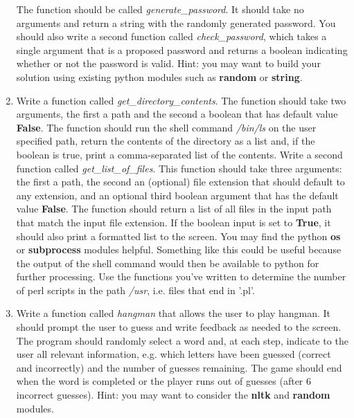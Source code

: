 \documentclass[12pt]{article}
\begin{document}
\begin{enumerate}
The function should be called  \textit{generate\_password}. It should take no arguments and return a string with the randomly generated password.  You should also write a second function called \textit{check\_password}, which takes a single argument that is a proposed password and returns a boolean indicating whether or not the password is valid.  Hint: you may want to build your solution using existing python modules such as \textbf{random} or \textbf{string}.

\item Write a function called \textit{get\_directory\_contents}.  The function should take two arguments, the first a path and the second a boolean that has default value \textbf{False}.  The function should run the shell command \textit{/bin/ls} on the user specified path, return the contents of the directory as a list and, if the boolean is true, print a comma-separated list of the contents.  Write a second function called \textit{get\_list\_of\_files}.  This function should take three arguments: the first a path, the second an (optional) file extension that should default to any extension, and an optional third boolean argument that has the default value \textbf{False}.  The function should return a list of all files in the input path that match the input file extension.  If the boolean input is set to \textbf{True}, it should also print a formatted list to the screen. You may find the python \textbf{os} or \textbf{subprocess} modules helpful.  Something like this could be useful because the output of the shell command would then be available to python for further processing.  Use the functions you've written to determine the number of perl scripts in the path \textit{/usr}, i.e. files that end in '.pl'.

\item Write a function called \textit{hangman} that allows the user to play hangman.  It should prompt the user to guess and write feedback as needed to the screen.  The program should randomly select a word and, at each step, indicate to the user all relevant information, e.g. which letters have been guessed (correct and incorrectly) and the number of guesses remaining.  The game should end when the word is completed or the player runs out of guesses (after 6 incorrect guesses).  Hint: you may want to consider the \textbf{nltk} and \textbf{random} modules.


\end{enumerate}
\end{document}
